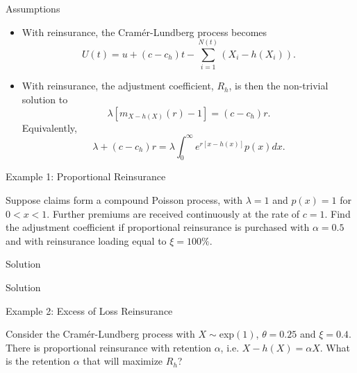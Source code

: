 \documentclass[11pt]{beamer}
\begin{document}
\begin{frame}{Assumptions}

\begin{itemize}

\item With reinsurance, the Cram\'er-Lundberg process  becomes
$$U(t)=u+(c-c_h)t-\sum_{i=1}^{N(t)} (X_i-h(X_i)).$$

\vfill

\item With
reinsurance, the adjustment coefficient, $R_{h}$, is then the non-trivial
solution to
$$\lambda \left[ m_{X-h(X)}(r)-1\right]=(c-c_h)r.$$
Equivalently,
$$\lambda +\left( c-c_{h}\right) r=\lambda \int_{0}^{\infty }e^{r\left[x-h\left( x\right) \right] }p\left( x\right) dx.$$

\end{itemize}

\end{frame}
\begin{frame}{Example 1: Proportional Reinsurance}

\vspace{-3.3cm}

Suppose claims form a compound Poisson process, with
$\lambda =1$ and $p\left( x\right) =1$ for $0<x<1$. Further premiums are received continuously at the rate of $c=1$. Find the adjustment coefficient if proportional reinsurance is purchased with $\alpha =0.5$ and with reinsurance loading equal to $\xi = 100\%$.



\end{frame}
\begin{frame}{Solution}

\end{frame}
\begin{frame}{Solution}

\end{frame}
\begin{frame}{Example 2: Excess of Loss Reinsurance}

\vspace{-3.5cm}
Consider the Cram\'er-Lundberg process with $X\sim$exp$(1)$, $\theta=0.25$ and $\xi=0.4$. There is  proportional reinsurance with retention $\alpha$, i.e. $X-h(X)=\alpha X$. What is the retention $\alpha$ that will maximize $R_h$?

\end{frame}
\end{document}
